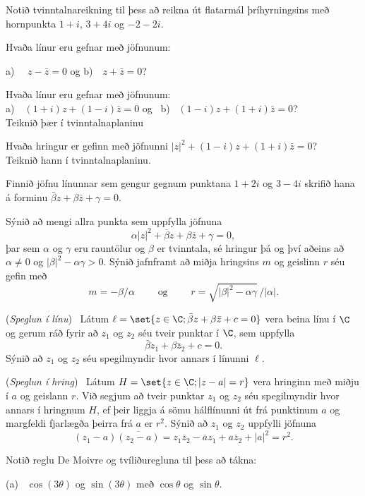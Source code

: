 \daemi Notið tvinntalnareikning til þess að reikna út flatarmál 
þríhyrningsins með hornpunkta $1+i$, $3+4i$ og $-2-2i$.

\daemi Hvaða línur eru gefnar með jöfnunum: 

a) \ \ $z-\bar z=0$ og   b)\ \ $z+\bar z=0$?

\daemi  Hvaða línur eru gefnar með jöfnunum:
\\
a)\ \ $(1+i)z+(1-i)\bar z=0$  og \ b) \ $(1-i)z+(1+i)\bar z=0$?  
\\
Teiknið þær í tvinntalnaplaninu

\daemi   Hvaða hringur er gefinn með jöfnunni 
$|z|^2+(1-i)z+(1+i)\bar z=0$? \\ Teiknið hann í tvinntalnaplaninu.

\daemi Finnið jöfnu línunnar sem gengur gegnum punktana $1+2i$ 
og  $3-4i$ skrifið hana á forminu $\bar \beta z+\beta\bar z+\gamma=0$.

\daemi Sýnið að mengi allra punkta sem uppfylla jöfnuna
 \begin{equation*}\alpha|z|^2+\overline \beta z+\beta\overline z +\gamma=0,
 \end{equation*}
þar sem $\alpha$ og $\gamma$ eru rauntölur og $\beta$ er tvinntala,
sé hringur þá og því aðeins að $\alpha\neq 0$ og 
$|\beta|^2-{\alpha}\gamma>0$.   Sýnið jafnframt að miðja hringsins
$m$ og 
geislinn  $r$ séu gefin með
$$m=-\beta/\alpha\qquad \text{ og } \qquad
r=\sqrt{|\beta|^2-\alpha\gamma}\, /|\alpha|.
$$

\daemi ({\it Speglun í línu}) \ Látum $\ell=\set
{z\in \C;  \bar {\beta}z+{\beta}\bar
z+c=0}$ vera beina línu í $\C$ og gerum ráð fyrir að $z_1$ og
$z_2$ séu tveir punktar í $\C$, sem uppfylla 
$$
\bar {\beta} z_1+{\beta}\bar z_2+c=0.
$$
Sýnið að $z_1$ og $z_2$ séu spegilmyndir hvor annars í línunni $\ell$.

\daemi ({\it Speglun í hring}) \ Látum $H=\set{z\in \C; |z-a|=r}$ vera hringinn með miðju í
$a$ og geislann $r$.  Við segjum að tveir punktar $z_1$ og $z_2$ séu
spegilmyndir hvor annars í hringnum $H$, ef þeir liggja á sömu
hálflínunni út frá punktinum $a$ og margfeldi fjarlægða þeirra frá $a$
er $r^2$.  Sýnið að $z_1$ og $z_2$ uppfylli jöfnuna
$$
(z_1-a)\overline{(z_2-a)}=z_1\overline z_2-\overline a z_1+a\overline
z_2 +|a|^2=r^2.
$$

\daemi Notið reglu De Moivre og tvíliðuregluna 
til þess að tákna:

\smallskip\noindent
(a) \ 
$\cos(3\theta)$  
og $\sin (3\theta)$ með  $\cos\theta$ og $\sin \theta$.


